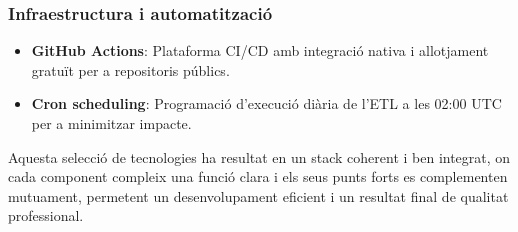 \subsubsection{Infraestructura i automatització}
\begin{itemize}
    \item \textbf{GitHub Actions}: Plataforma CI/CD amb integració nativa i allotjament gratuït per a repositoris públics.
    \item \textbf{Cron scheduling}: Programació d'execució diària de l'ETL a les 02:00 UTC per a minimitzar impacte.
\end{itemize}

Aquesta selecció de tecnologies ha resultat en un stack coherent i ben integrat, on cada component compleix una funció clara i els seus punts forts es complementen mutuament, permetent un desenvolupament eficient i un resultat final de qualitat professional.



